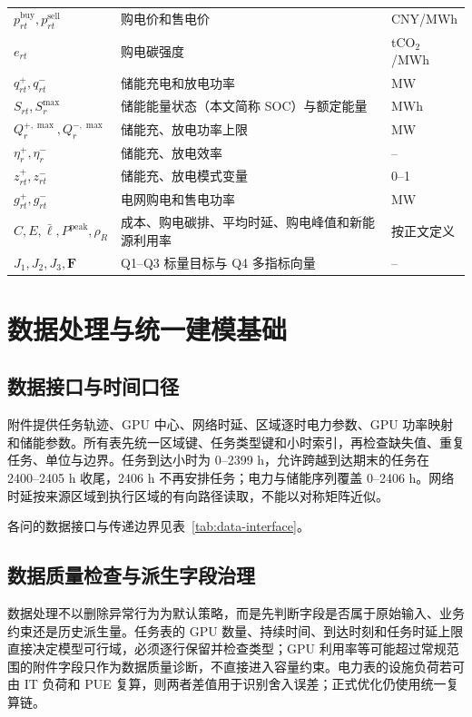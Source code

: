 {\begin{longtable}{@{}p{}p{}p{}@{}}
$p^{\mathrm{buy}}_{rt},p^{\mathrm{sell}}_{rt}$ & 购电价和售电价 & CNY/MWh \\
$e_{rt}$ & 购电碳强度 & tCO$_2$/MWh \\
$q^+_{rt},q^-_{rt}$ & 储能充电和放电功率 & MW \\
$S_{rt},S_r^{\max}$ & 储能能量状态（本文简称 SOC）与额定能量 & MWh \\
$Q_r^{+,\max},Q_r^{-,\max}$ & 储能充、放电功率上限 & MW \\
$\eta_r^+,\eta_r^-$ & 储能充、放电效率 & -- \\
$z^+_{rt},z^-_{rt}$ & 储能充、放电模式变量 & 0--1 \\
$g^+_{rt},g^-_{rt}$ & 电网购电和售电功率 & MW \\
$C,E,\bar\ell,P^{\mathrm{peak}},\rho_R$ & 成本、购电碳排、平均时延、购电峰值和新能源利用率 & 按正文定义 \\
$J_1,J_2,J_3,\boldsymbol F$ & Q1--Q3 标量目标与 Q4 多指标向量 & -- \\
\bottomrule
\end{longtable}
}

\section{数据处理与统一建模基础}

\subsection{数据接口与时间口径}

附件提供任务轨迹、GPU 中心、网络时延、区域逐时电力参数、GPU 功率映射和储能参数。所有表先统一区域键、任务类型键和小时索引，再检查缺失值、重复任务、单位与边界。任务到达小时为 0--2399 h，允许跨越到达期末的任务在 2400--2405 h 收尾，2406 h 不再安排任务；电力与储能序列覆盖 0--2406 h。网络时延按来源区域到执行区域的有向路径读取，不能以对称矩阵近似。

各问的数据接口与传递边界见表~\ref{tab:data-interface}。

\TableDataInterfaces

\subsection{数据质量检查与派生字段治理}

数据处理不以删除异常行为为默认策略，而是先判断字段是否属于原始输入、业务约束还是历史派生量。任务表的 GPU 数量、持续时间、到达时刻和任务时延上限直接决定模型可行域，必须逐行保留并检查类型；GPU 利用率等可能超过常规范围的附件字段只作为数据质量诊断，不直接进入容量约束。电力表的设施负荷若可由 IT 负荷和 PUE 复算，则两者差值用于识别舍入误差；正式优化仍使用统一复算链。

